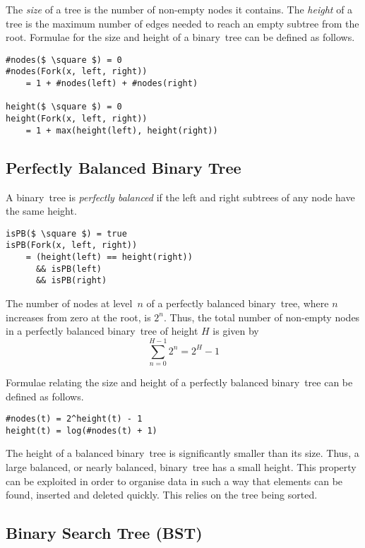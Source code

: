 The \emph{size} of a tree is the number of non-empty nodes it contains.
The \emph{height} of a tree is the maximum number of edges needed to reach an empty subtree from the root.
Formulae for the size and height of a binary~tree can be defined as follows.
\begin{lstlisting}[mathescape=true]
#nodes($ \square $) = 0
#nodes(Fork(x, left, right))
    = 1 + #nodes(left) + #nodes(right)

height($ \square $) = 0
height(Fork(x, left, right))
    = 1 + max(height(left), height(right))
\end{lstlisting}

\subsection{Perfectly Balanced Binary Tree}

A binary~tree is \emph{perfectly balanced} if the left and right subtrees of any node have the same height.
\begin{lstlisting}[mathescape=true]
isPB($ \square $) = true
isPB(Fork(x, left, right))
    = (height(left) == height(right))
      && isPB(left)
      && isPB(right)
\end{lstlisting}

The number of nodes at level~\( n \) of a perfectly balanced binary~tree, where \( n \) increases from zero at the root, is \( 2^{n} \).
Thus, the total number of non-empty nodes in a perfectly balanced binary~tree of height \( H \) is given by
\begin{equation*}
  \sum_{n=0}^{H-1} 2^{n} = 2^{H} - 1
\end{equation*}

Formulae relating the size and height of a perfectly balanced binary~tree can be defined as follows.
\begin{lstlisting}[mathescape=true]
#nodes(t) = 2^height(t) - 1
height(t) = log(#nodes(t) + 1)
\end{lstlisting}

The height of a balanced binary~tree is significantly smaller than its size.
Thus, a large balanced, or nearly balanced, binary~tree has a small height.
This property can be exploited in order to organise data in such a way that elements can be found, inserted and deleted quickly.
This relies on the tree being sorted.

\subsection{Binary Search Tree (BST)}

